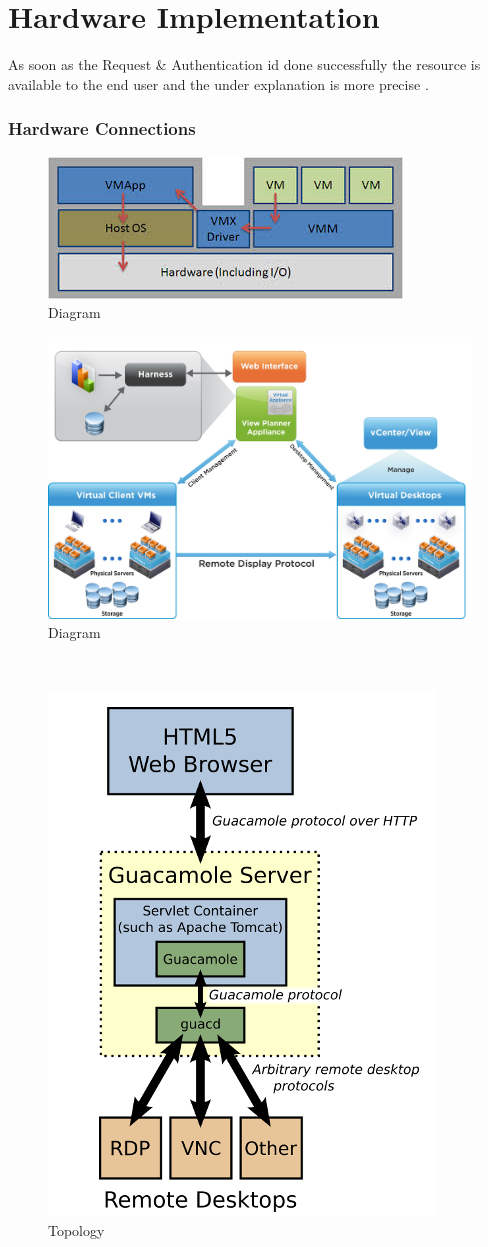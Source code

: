 \documentclass[12pt,a4paper,final,oneside]{report}
\begin{document}
\section{Hardware Implementation}
As soon as the Request \& Authentication id done successfully the resource is available to the end user and the under explanation is more precise . 
\subsubsection{Hardware Connections}
\noindent\begin{figure}[h!]
		\centering
		\includegraphics[width=0.685\linewidth,angle=0]{vm.jpg}
		\caption{Diagram }
	\end{figure}
\noindent \begin{figure}[h!]
		\centering
		\includegraphics[width=0.685\linewidth,angle=0]{v1.jpg}
		\caption{Diagram }
	\end{figure}	
	\\
	\noindent \begin{figure}[h!]
		\centering
\includegraphics[width=0.685\linewidth,angle=0]{topology.png}
		\caption{Topology }
	\end{figure}
\end{document}
